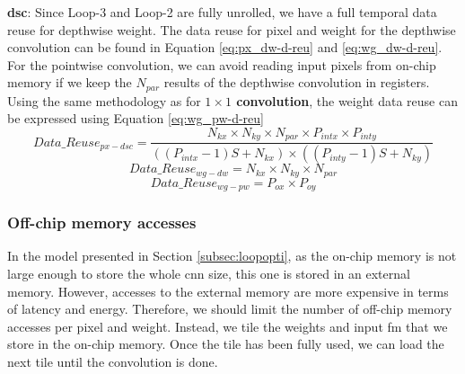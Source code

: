 \textbf{\acrshort{dsc}}: Since Loop-3 and Loop-2 are fully unrolled, we have a full temporal data reuse for depthwise weight. The data reuse for pixel and weight for the depthwise convolution can be found in Equation \eqref{eq:px_dw-d-reu} \cite{ma_optimizing_2018} and \eqref{eq:wg_dw-d-reu}. For the pointwise convolution, we can avoid reading input pixels from on-chip memory if we keep the $N_{par}$ results of the depthwise convolution in registers.
Using the same methodology as for \textbf{$1 \times 1$ convolution}, the weight data reuse can be expressed using Equation \eqref{eq:wg_pw-d-reu}
%
\begin{equation}
    Data\_Reuse_{px - dsc} = \frac{N_{kx} \times N_{ky} \times N_{par} \times P_{intx} \times P_{inty}}{\left( \left( P_{intx} - 1 \right)S + N_{kx} \right) \times \left( \left( P_{inty} - 1 \right)S + N_{ky} \right)}
    \label{eq:px_dw-d-reu}
\end{equation}
\begin{equation}
    Data\_Reuse_{wg-dw} = N_{kx} \times N_{ky} \times N_{par}
    \label{eq:wg_dw-d-reu}
\end{equation}
\begin{equation}
    Data\_Reuse_{wg-pw} = P_{ox} \times P_{oy}
    \label{eq:wg_pw-d-reu}
\end{equation}
%
\subsubsection{Off-chip memory accesses}
%
In the model presented in Section \ref{subsec:loopopti}, as the on-chip memory is not large enough to store the whole \acrshort{cnn} size, this one is stored in an external memory. However, accesses to the external memory are more expensive in terms of latency and energy. Therefore, we should limit the number of off-chip memory accesses per pixel and weight. Instead, we tile the weights and input \acrshort{fm} that we store in the on-chip memory. Once the tile has been fully used, we can load the next tile until the convolution is done.

